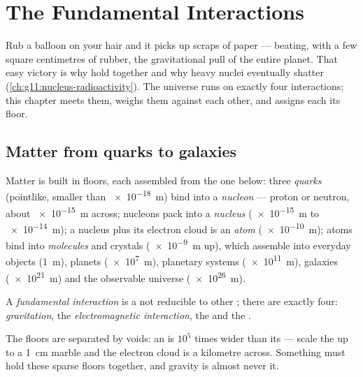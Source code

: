 \chapter{The Fundamental Interactions}\label{ch:g11:fundamental-interactions}

Rub a balloon on your hair and it picks up scraps of paper --- beating,
with a few square centimetres of rubber, the gravitational pull of the
entire planet. That easy victory is why  hold together and why
heavy nuclei eventually shatter (\cref{ch:g11:nucleus-radioactivity}).
The universe runs on exactly four interactions; this chapter meets
them, weighs them against each other, and assigns each its floor.

\section{Matter from quarks to galaxies}

\begin{definition}\label{def:g11:fundamental-interactions:ladder}
Matter is built in floors, each assembled from the one below: three
\emph{quarks} (pointlike, smaller than \qty{e-18}{m}) bind
into a \emph{nucleon} --- proton or neutron, about
\qty{e-15}{m} across; nucleons pack into a \emph{nucleus}
(\qty{e-15}{m} to \qty{e-14}{m}); a nucleus plus its electron cloud is
an \emph{atom} (\qty{e-10}{m}); atoms bind into
\emph{molecules} and crystals (\qty{e-9}{m} up), which
assemble into everyday objects (\qty{1}{m}), planets (\qty{e7}{m}),
planetary systems (\qty{e11}{m}), galaxies (\qty{e21}{m}) and the
observable universe (\qty{e26}{m}).
\end{definition}

\begin{definition}\label{def:g11:fundamental-interactions:four}
A \emph{fundamental interaction} is a
 not reducible to other ; there are exactly four:
\emph{gravitation}, the \emph{electromagnetic interaction},
the  and the .
\end{definition}

\begin{remark}\label{rem:g11:fundamental-interactions:empty}
The floors are separated by voids: an  is $10^{5}$ times wider than
its  --- scale the  up to a \qty{1}{cm} marble and the
electron cloud is a kilometre across. Something must hold these sparse
floors together, and gravity is almost never it.
\end{remark}

